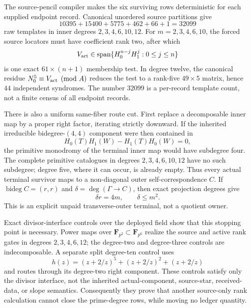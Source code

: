 \documentclass[11pt]{article}
\begin{document}
The source-pencil compiler makes the six surviving rows deterministic for
each supplied endpoint record.  Canonical unordered source partitions give
\[
  10395+15400+5775+462+66+1=32099
\]
raw templates in inner degrees \(2,3,4,6,10,12\).  For
\(m=2,3,4,6,10\), the forced source locators must have coefficient rank
two, after which
\[
  V_{\rm act}\in
  \operatorname{span}\{H_0^{n-j}H_1^j:0\le j\le n\}
\]
is one exact \(61\times(n+1)\) membership test.  In degree twelve, the
canonical residue \(N_0^5\equiv V_{\rm act}\pmod A\) reduces the test to a
rank-five \(49\times5\) matrix, hence \(44\) independent syndromes.  The
number \(32099\) is a per-record template count, not a finite census of all
endpoint records.

There is also a uniform same-fiber route cut.  First replace a decomposable
inner map by a proper right factor, iterating strictly downward.  If the
inherited irreducible bidegree-\((4,4)\) component were then contained in
\[
  H_0(T)H_1(W)-H_1(T)H_0(W)=0,
\]
the primitive monodromy of the terminal inner map would have subdegree four.
The complete primitive catalogues in degrees \(2,3,4,6,10,12\) have no such
subdegree; degree five, where it can occur, is already empty.  Thus every
actual terminal survivor maps to a non-diagonal outer self-correspondence
\(C\).  If \(\operatorname{bideg}C=(r,r)\) and
\(\delta=\deg(\Gamma\to C)\), then exact projection degrees give
\[
  \delta r=4m,\qquad \delta\le m^2.
\]
This is an explicit unpaid transverse-outer terminal, not a quotient owner.

Exact divisor-interface controls over the deployed field show that this
stopping point is necessary.  Power maps over
\(\mathbf F_{p^2}\subset\mathbf F_{p^6}\) realize the source and active
rank gates in degrees \(2,3,4,6,12\); the degree-two and degree-three
controls are indecomposable.  A separate split degree-ten control uses
\[
  h(z)=(z+2/z)^5+(z+2/z)^2+(z+2/z)
\]
and routes through its degree-two right component.  These controls satisfy
only the divisor interface, not the inherited actual-component,
source-star, received-data, or slope semantics.  Consequently they prove
that another source-only rank calculation cannot close the prime-degree
rows, while moving no ledger quantity.
\end{document}
